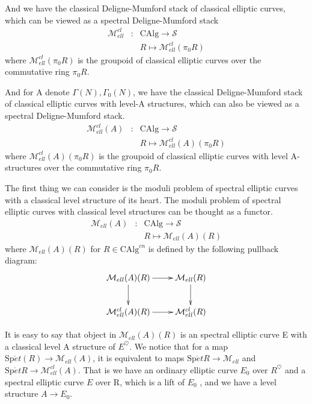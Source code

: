 \documentclass[12pt]{article}
\theoremstyle{thry}
\def  \CAlg     {\mathrm{CAlg}}
\def  \Spet     {\mathrm{Sp}\acute{e}t}
\def  \cm       {\mathcal{M}}
\def  \cs       {\mathcal{S}}
\begin{document}
And we have the  classical Deligne-Mumford stack of classical elliptic curves, which can be viewed as a spectral Deligne-Mumford stack 
\begin{eqnarray*}
	\cm^{cl}_{ell} & : &\CAlg \to    \cs  \\	                       
	&  & R  \longmapsto     \cm^{cl}_{ell}(\pi_0 R)   
\end{eqnarray*}
where $\cm^{cl}_{ell}(\pi_0 R)$ is the groupoid  of classical elliptic curves over the commutative ring $\pi_0 R$.

And for A denote  $\Gamma(N), \Gamma_0(N)$, we have the classical  Deligne-Mumford stack of classical elliptic curves with level-A structures, which can also be viewed as a  spectral Deligne-Mumford stack. 
\begin{eqnarray*}
	\cm^{cl}_{ell}(A) & : &\CAlg \to    \cs  \\	                       
	&  & R  \longmapsto     \cm^{cl}_{ell}(A)(\pi_0 R)   
\end{eqnarray*}
where $\cm^{cl}_{ell}(A)(\pi_0 R)$ is the groupoid  of classical elliptic curves with level A-structures over the commutative ring $\pi_0 R$.


\qquad The first thing we can consider is the moduli problem of spectral elliptic curves with  a classical level structure of its heart. The moduli problem of spectral elliptic curves  with  classical level structures can be thought as a functor. 
\begin{eqnarray*}
	\cm_{ell}(A) & : &\CAlg \to    \cs  \\	                       
	&  & R  \longmapsto     \cm_{ell}(A)(R)   
\end{eqnarray*}
where $\cm_{ell}(A)(R)$ for $R \in \CAlg^{cn}$ is defined by the following pullback diagram:
$$
\xymatrix{
	\cm_{ell}(A)(R)  \ar[r]  \ar[d]   &  \cm_{ell}(R) \ar[d]  \\
	\cm^{cl}_{ell}(A)(R)  \ar[r]  &\cm^{cl}_{ell}(R) 
}
$$

It is easy to say that object in $\cm_{ell}(A)(R)$ is  an spectral elliptic curve  E with  a classical level A structure of $E^{\heartsuit}$. We notice that  for a map $\Spet(R) \to \cm_{ell}(A)$, it is equivalent  to maps $\Spet R  \to \cm_{ell}$ and $\Spet R \to \cm^{cl}_{ell}(A)$. That is we have an ordinary elliptic curve $E_0$ over $R^{\heartsuit}$ and a spectral elliptic curve $E$ over R, which is a lift of $E_0$ , and we have a level structure $A  \to E_0$.
\end{document}
